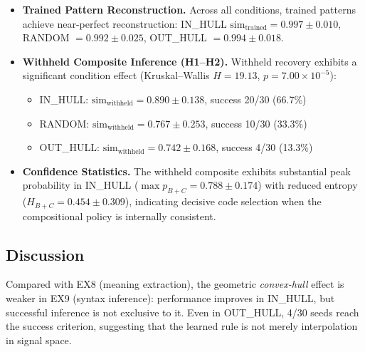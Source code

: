 \documentclass{article}
\begin{document}
\begin{itemize}
    \item \textbf{Trained Pattern Reconstruction.}
    Across all conditions, trained patterns achieve near-perfect reconstruction:
    IN\_HULL $\mathrm{sim}_{\text{trained}} = 0.997 \pm 0.010$,
    RANDOM $= 0.992 \pm 0.025$,
    OUT\_HULL $= 0.994 \pm 0.018$.

    \item \textbf{Withheld Composite Inference (H1--H2).}
    Withheld recovery exhibits a significant condition effect (Kruskal--Wallis $H = 19.13$, $p = 7.00 \times 10^{-5}$):
    \begin{itemize}
        \item IN\_HULL: $\mathrm{sim}_{\text{withheld}} = 0.890 \pm 0.138$, success 20/30 (66.7\%)
        \item RANDOM: $\mathrm{sim}_{\text{withheld}} = 0.767 \pm 0.253$, success 10/30 (33.3\%)
        \item OUT\_HULL: $\mathrm{sim}_{\text{withheld}} = 0.742 \pm 0.168$, success 4/30 (13.3\%)
    \end{itemize}

    \item \textbf{Confidence Statistics.}
    The withheld composite exhibits substantial peak probability in IN\_HULL ($\max p_{B{+}C} = 0.788 \pm 0.174$) with reduced entropy ($H_{B{+}C} = 0.454 \pm 0.309$), indicating decisive code selection when the compositional policy is internally consistent.
\end{itemize}


\subsection{Discussion}

Compared with EX8 (meaning extraction), the geometric \emph{convex-hull} effect is weaker in EX9 (syntax inference): performance improves in IN\_HULL, but successful inference is not exclusive to it.
Even in OUT\_HULL, 4/30 seeds reach the success criterion, suggesting that the learned rule is not merely interpolation in signal space.
\end{document}
